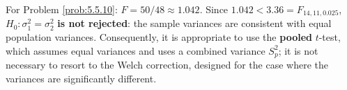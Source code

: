 \begin{solucion}
	\label{sol:5.5.10}
	For Problem \ref{prob:5.5.10}: $F = 50/48 \approx 1.042$. Since $1.042 < 3.36 = F_{14,11,0.025}$, $H_0:\sigma_1^2=\sigma_2^2$ \textbf{is not rejected}: the sample variances are consistent with equal population variances. Consequently, it is appropriate to use the \textbf{pooled} $t$-test, which assumes equal variances and uses a combined variance $S_p^2$; it is not necessary to resort to the Welch correction, designed for the case where the variances are significantly different. \quad \qedhere
\end{solucion}
